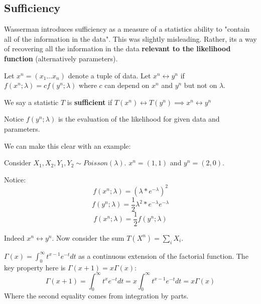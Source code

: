 \documentclass[10pt]{article}
\begin{document}
\subsection{Sufficiency}

Wasserman introduces sufficiency as a measure of a statistics ability to
"contain all of the information in the data". This was slightly misleading.
Rather, its a way of recovering all the information in the data
\textbf{relevant to the likelihood function} (alternatively parameters).

\begin{definition}
    Let $x^n = (x_1 \dots x_n)$ denote a tuple of data.
    Let $x^n \leftrightarrow y^n$ if $f(x^n; \lambda) = cf(y^n; \lambda)$ where
    $c$ can depend on $x^n$ and $y^n$ but not on $\lambda$. 

    We say a statistic $T$ is \textbf{sufficient} if $T(x^n) \leftrightarrow
    T(y^n) \implies x^n \leftrightarrow y^n$
\end{definition}

Notice $f(y^n; \lambda)$ is the evaluation of the likelihood for given data and
parameters.

We can make this clear with an example:

\begin{example}
    Consider $X_1, X_2, Y_1, Y_2 \sim Poisson(\lambda)$. $x^n = (1, 1)$ and
    $y^n = (2, 0)$.

    Notice: 
    \[f(x^n; \lambda) = (\lambda*e^{-\lambda})^2\]
    \[f(y^n; \lambda) = \frac{1}{2}\lambda^2*e^{-\lambda}e^{-\lambda}\]
    \[f(x^n; \lambda) = \frac{1}{2}f(y^n; \lambda)\]

    Indeed $x^n \leftrightarrow y^n$. Now consider the sum $T(X^n) = \sum_i
    X_i$.
\end{example}

\begin{note}
    $\Gamma(x) = \int_0^{\infty} t^{x-1}e^{-t} dt$ as a continuous extension of
    the factorial function.
    The key property here is $\Gamma(x+1) = x\Gamma(x)$:
    \[\Gamma(x+1) = \int_0^{\infty} t^{x}e^{-t} dt = x\int_0^{\infty}
    t^{x-1}e^{-t} dt = x\Gamma(x)\]
    Where the second equality comes from integration by parts.
\end{note}
\end{document}
